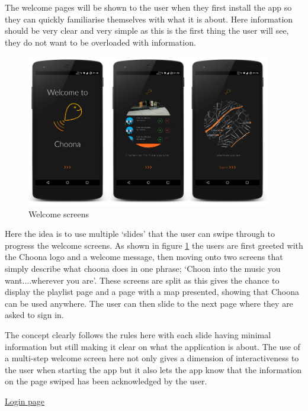 The welcome pages will be shown to the user when they first install the app so they can quickly familiarise themselves with what it is about. Here information should be very clear and very simple as this is the first thing the user will see, they do not want to be overloaded with information. \\

\noindent
\begin{figure}[h!]
\centering
\includegraphics[width=0.95\textwidth]{./img/welcomeframed.png}
\caption{Welcome screens}
\label{fig:welcomescreens}
\end{figure}

Here the idea is to use multiple `slides' that the user can swipe through to progress the welcome screens. As shown in figure \ref{fig:welcomescreens} the users are first greeted with the Choona logo and a welcome message, then moving onto two screens that simply describe what choona does in one phrase; `Choon into the music you want....wherever you are'. These screens are split as this gives the chance to display the playlist page and a page with a map presented, showing that Choona can be used anywhere. The user can then slide to the next page where they are asked to sign in. 

The concept clearly follows the rules here with each slide having minimal information but still making it clear on what the application is about. The use of a multi-step welcome screen here not only gives a dimension of interactiveness to the user when starting the app but it also lets the app know that the information on the page swiped has been acknowledged by the user.  

\clearpage

\noindent\underline{Login page}\newline


